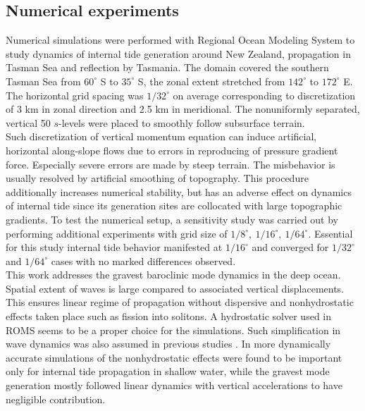\documentclass[12pt]{article}
\begin{document}
\subsection{Numerical experiments}
\label{C3.sec:model}
Numerical simulations were performed with Regional Ocean Modeling System 
\citep{shchepetkin2005regional} to study dynamics of internal tide generation around New Zealand, 
propagation in Tasman Sea and reflection by Tasmania. The domain covered the southern Tasman Sea 
from $60^{\circ}$ S to $35^{\circ}$ S, the zonal extent stretched from $142^{\circ}$ to 
$172^{\circ}$ E. The horizontal grid spacing was $1/32^{\circ}$ on average corresponding to 
discretization of 3 km 
in zonal direction and 2.5 km in meridional. The nonuniformly separated, vertical 50 $s$-levels 
were placed to smoothly follow subsurface terrain.\\
Such discretization of vertical momentum equation can induce artificial, horizontal  
along-slope flows \citep{haidvogel1999numerical} due to errors in reproducing of pressure 
gradient force. Especially severe errors are made by steep terrain. The misbehavior is usually 
resolved by artificial smoothing of topography. This procedure additionally increases numerical 
stability, but has an adverse effect on dynamics of internal tide \citep{di2006numerical} since 
its generation sites are collocated with large topographic gradients. To test the numerical 
setup, a sensitivity study was carried out by performing additional experiments with grid size of   
$1/8^{\circ},~1/16^{\circ},~1/64^{\circ}$. Essential for this study 
internal tide behavior manifested at $1/16^{\circ}$ and converged for $1/32^{\circ}$ and 
$1/64^{\circ}$ cases with no marked differences observed.\\

This work addresses the gravest baroclinic mode dynamics in the deep ocean. Spatial 
extent of 
waves is large compared to associated vertical displacements. This ensures linear regime of 
propagation without dispersive and nonhydrostatic effects taken place such as fission into 
solitons. A hydrostatic solver used in ROMS seems to be a proper choice for the simulations. Such 
simplification in wave dynamics was also assumed in previous studies \citep{carter2008energetics, 
merrifield2001generation,  merrifield2002model, kerry2013effects}. In more dynamically 
accurate   
simulations of \citep{kang2012energetics, zhang2011three} the nonhydrostatic effects were found to 
be important only for internal tide propagation in shallow water, while the gravest mode generation 
mostly followed linear dynamics with vertical accelerations to have negligible contribution.\\
\end{document}
